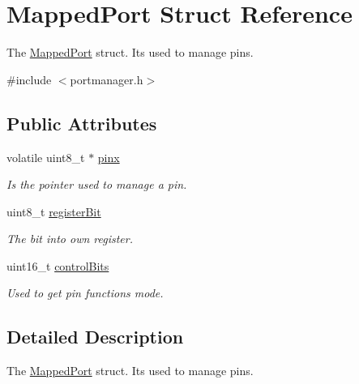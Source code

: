 \hypertarget{structMappedPort}{}\section{Mapped\+Port Struct Reference}
\label{structMappedPort}


The \mbox{\hyperlink{structMappedPort}{Mapped\+Port}} struct. It\textquotesingle{}s used to manage pins.  




{\ttfamily \#include $<$portmanager.\+h$>$}

\subsection*{Public Attributes}
\begin{DoxyCompactItemize}
\item 
\mbox{\label{structMappedPort_a504fc8fe2e91d886ed39d36a3c4e40f8}} 
volatile uint8\+\_\+t $\ast$ \mbox{\hyperlink{structMappedPort_a504fc8fe2e91d886ed39d36a3c4e40f8}{pinx}}
\begin{DoxyCompactList}\small\item\em Is the pointer used to manage a pin. \end{DoxyCompactList}\item 
\mbox{\label{structMappedPort_a5a906790bc9881785c9c166c8591dfc2}} 
uint8\+\_\+t \mbox{\hyperlink{structMappedPort_a5a906790bc9881785c9c166c8591dfc2}{register\+Bit}}
\begin{DoxyCompactList}\small\item\em The bit into own register. \end{DoxyCompactList}\item 
uint16\+\_\+t \mbox{\hyperlink{structMappedPort_ae73f042b9d9a8a1a87d489525a2ca947}{control\+Bits}}
\begin{DoxyCompactList}\small\item\em Used to get pin functions mode. \end{DoxyCompactList}\end{DoxyCompactItemize}


\subsection{Detailed Description}
The \mbox{\hyperlink{structMappedPort}{Mapped\+Port}} struct. It\textquotesingle{}s used to manage pins. 


